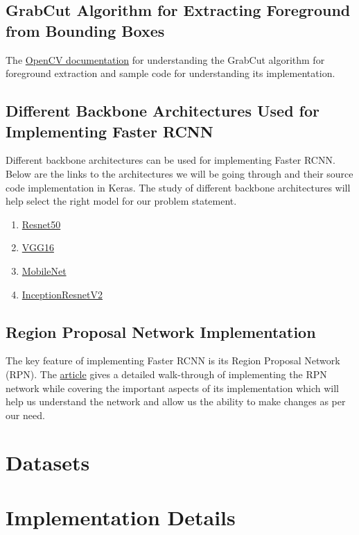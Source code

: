 \documentclass[12pt, a4paper, twoside]{article}
\begin{document}
\subsection{GrabCut Algorithm for Extracting Foreground from Bounding Boxes}
The \href{https://docs.opencv.org/3.4/d8/d83/tutorial_py_grabcut.html}{OpenCV documentation} for understanding the GrabCut algorithm for foreground extraction and sample code for understanding its implementation. 

\subsection{Different Backbone Architectures Used for Implementing Faster RCNN}
Different backbone architectures can be used for implementing Faster RCNN. Below are the links to the architectures we will be going through and their source code implementation in Keras. The study of different backbone architectures will help select the right model for our problem statement.
\begin{enumerate}
	\item \href{https://keras.io/api/applications/resnet/}{Resnet50} 
	\item \href{https://keras.io/api/applications/vgg/}{VGG16}
	\item \href{https://keras.io/api/applications/mobilenet/}{MobileNet}
	\item \href{https://keras.io/api/applications/inceptionresnetv2/}{InceptionResnetV2}
\end{enumerate}

\subsection{Region Proposal Network Implementation}
The key feature of implementing Faster RCNN is its Region Proposal Network (RPN). The \href{https://martian1231-py.medium.com/region-proposal-network-rpn-in-faster-rcnn-from-scratch-in-keras-1311c67c13cf}{article} gives a detailed walk-through of implementing the RPN network while covering the important aspects of its implementation which will help us understand the network and allow us the ability to make changes as per our need.

\section{Datasets}
\lipsum[4]

\section{Implementation Details}
\end{document}
